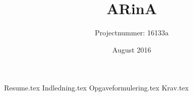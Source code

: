 \documentclass{report}
\title{ARinA}
\author{Projectnummer: 16133a}
\date{August 2016}
\begin{document}
\maketitle

\tableofcontents    

\clearpage



{Resume.tex}
{Indledning.tex}
{Opgaveformulering.tex}
{Krav.tex}
\end{document}
